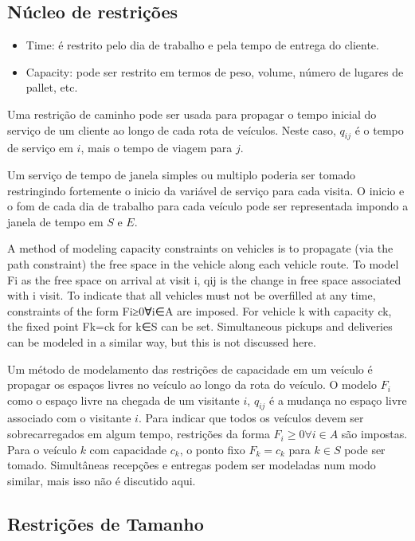 \documentclass[a4paper, 12pt]{article}
\begin{document}
\subsection{Núcleo de restrições}

\begin{itemize}
\item Time: é restrito pelo dia de trabalho e pela tempo de entrega do cliente.
\item Capacity: pode ser restrito em termos de peso, volume, número de lugares de pallet, etc.
\end{itemize}


 Uma restrição de caminho pode ser usada para propagar o tempo inicial do serviço de um cliente ao
longo de cada rota de veículos. Neste caso, $q_{ij}$ é o tempo de serviço em $i$, mais o tempo de
viagem para $j$.

 Um serviço de tempo de janela simples ou multiplo poderia ser tomado restringindo fortemente o
inicio da variável de serviço para cada visita. O inicio e o fom de cada dia de trabalho para cada
veículo pode ser representada impondo a janela de tempo em $S$ e $E$.

A method of modeling capacity constraints on vehicles is to propagate (via the path constraint) the
free space in the vehicle along each vehicle route. To model Fi as the free space on arrival at
visit i, qij is the change in free space associated with i visit. To indicate that all vehicles must
not be overfilled at any time, constraints of the form Fi≥0∀i∈A are imposed. For vehicle k with
capacity ck, the fixed point Fk=ck for k∈S can be set. Simultaneous pickups and deliveries can be
modeled in a similar way, but this is not discussed here.

 Um método de modelamento das restrições de capacidade em um veículo é propagar os espaços livres no
veículo ao longo da rota do veículo. O modelo $F_i$ como o espaço livre na chegada de um visitante
$i$, $q_{ij}$ é a mudança no espaço livre associado com o visitante $i$. Para indicar que todos os
veículos devem ser sobrecarregados em algum tempo, restrições da forma $F_i \geq 0 \forall i \in A$
são impostas. Para o veículo $k$ com capacidade $c_k$, o ponto fixo $F_k=c_k$ para $k \in S$ pode
ser tomado. Simultâneas recepções e entregas podem ser modeladas num modo similar, mais isso não é
discutido aqui.

\subsection{Restrições de Tamanho}
\end{document}

